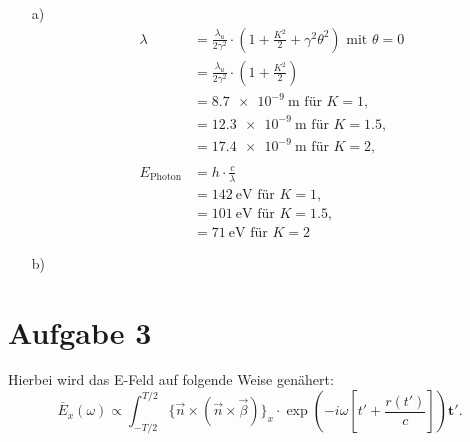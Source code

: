 \documentclass[11pt,a4paper]{article}
\begin{document}
	\begin{itemize}
		\item[a)]
		\begin{align*}
			\lambda &= \frac{\lambda_{u}}{2 \gamma^{2}} \cdot (1 + \frac{K^2}{2} + \gamma^2 \theta^2) \text{ mit } \theta = 0 \\
						&= \frac{\lambda_{u}}{2 \gamma^{2}} \cdot (1 + \frac{K^2}{2} ) \\ 
						&= \SI{8.7e-9}{\meter} \text{ für } K = 1, \\
						&= \SI{12.3e-9}{\meter} \text{ für } K = 1.5, \\
						&= \SI{17.4e-9}{\meter} \text{ für } K = 2, \\
						\\
			E_{\mathrm{Photon}} &= h \cdot \frac{c}{\lambda} \\
									&= \SI{142}{\electronvolt} \text{ für } K = 1, \\
									&= \SI{101}{\electronvolt} \text{ für } K = 1.5, \\
									&= \SI{71}{\electronvolt} \text{ für } K = 2			
		\end{align*}        	
        \item[b)]
			
	\end{itemize}


    \section*{Aufgabe 3}

	Hierbei wird das E-Feld auf folgende Weise genähert: \\ 
	\begin{equation*}
		\overline E_{x}(\omega) \propto \int_{-T/2}^{T/2} \{ \vec n \times (\vec n  \times \vec \beta)\}_{x} \cdot \exp(-i \omega [ t\prime + \frac{r(t\prime )}{c} ]) \mathbf{t\prime}  .
	\end{equation*}
\end{document}
